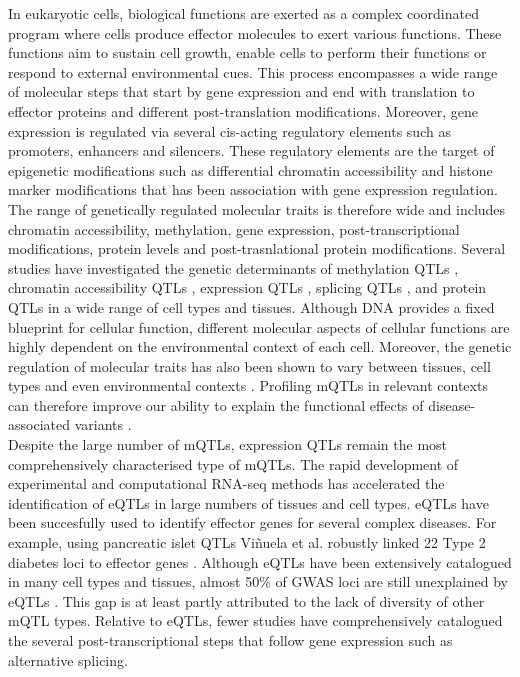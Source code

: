 In eukaryotic cells, biological functions are exerted as a complex coordinated program where cells produce effector molecules to exert various functions. These functions aim to sustain cell growth, enable cells to perform their functions or respond to external environmental cues. This process encompasses a wide range of molecular steps that start by gene expression and end with translation to effector proteins and different post-translation modifications. Moreover, gene expression is regulated via several cis-acting regulatory elements such as promoters, enhancers and silencers. These regulatory elements are the target of epigenetic modifications such as differential chromatin accessibility and histone marker modifications that has been association with gene expression regulation. The range of genetically regulated molecular traits is therefore wide and includes chromatin accessibility, methylation, gene expression, post-transcriptional modifications, protein levels and post-trasnlational protein modifications. Several studies have investigated the genetic determinants of methylation QTLs \cite{Oliva2023-nt,Hannon2016-mt,Morrow2018-fv,Taylor2019-tm,Huan2019-ke,Andrews2017-os}, chromatin accessibility QTLs \cite{Alasoo2018-pv,Currin2021-kp}, expression QTLs \cite{The_GTEx_Consortium2020-gg,Vosa2021-pb,Kerimov2021-gh}, splicing QTLs \cite{The_GTEx_Consortium2020-gg,Qi2022-iz}, and protein QTLs \cite{Yao2018-oy,Sun2018-uy} in a wide range of cell types and tissues. Although DNA provides a fixed blueprint for cellular function, different molecular aspects of cellular functions are highly dependent on the environmental context of each cell. Moreover, the genetic regulation of molecular traits has also been shown to vary between tissues, cell types and even environmental contexts \cite{Zhernakova2017-uo,Mu2021-ar}. Profiling mQTLs in relevant contexts can therefore improve our ability to explain the functional effects of disease-associated variants \cite{Ongen2017-cd}.\\

Despite the large number of mQTLs, expression QTLs remain the most comprehensively characterised type of mQTLs. The rapid development of experimental and computational RNA-seq methods has accelerated the identification of eQTLs in large numbers of tissues and cell types. eQTLs have been succesfully used to identify effector genes for several complex diseases. For example, using pancreatic islet QTLs Viñuela et al. robustly linked 22 Type 2 diabetes loci to effector genes \cite{Vinuela2020-ce}. Although eQTLs have been extensively catalogued in many cell types and tissues, almost 50\% of GWAS loci are still unexplained by eQTLs \cite{Mountjoy2021-fc}. This gap is at least partly attributed to the lack of diversity of other mQTL types. Relative to eQTLs, fewer studies have comprehensively catalogued the several post-transcriptional steps that follow gene expression such as alternative splicing.\\

